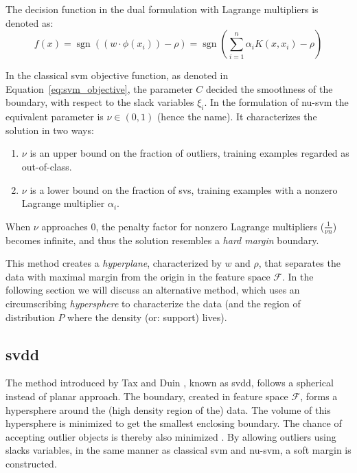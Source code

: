 The decision function in the dual formulation with Lagrange multipliers is denoted as:
\begin{equation}\label{eq:nu-svm_lagrange}
f(x) = \operatorname{sgn}((w \cdot \phi(x_i)) - \rho) = \operatorname{sgn}( \sum_{i=1}^n \alpha_i K(x, x_i) - \rho)
\end{equation}

In the classical \gls{svm} objective function, as denoted in Equation~\ref{eq:svm_objective}, the parameter $C$ decided the smoothness of the boundary, with respect to the slack variables $\xi_i$.
In the formulation of \gls{nu-svm} the equivalent parameter is $\nu \in (0,1)$ (hence the name).
It characterizes the solution in two ways:
\begin{enumerate}
  \item $\nu$ is an upper bound on the fraction of outliers, \ie training examples regarded as out-of-class.
  \item $\nu$ is a lower bound on the fraction of \glspl{sv}, \ie training examples with a nonzero Lagrange multiplier $\alpha_i$.
\end{enumerate}
When $\nu$ approaches $0$, the penalty factor for nonzero Lagrange multipliers ($\frac{1}{\nu n}$) becomes infinite, and thus the solution resembles a \emph{hard margin} boundary.

This method creates a \emph{hyperplane}, characterized by $w$ and $\rho$, that separates the data with maximal margin from the origin in the feature space $\mathcal{F}$.
In the following section we will discuss an alternative method, which uses an circumscribing \emph{hypersphere} to characterize the data (and the region of distribution $P$ where the density (or: support) lives).



\subsection{\acrlong{svdd}}\label{subsec:oc-svm-svdd}
The method introduced by Tax and Duin \cite{tax1999support}, known as \acrlong{svdd}, follows a spherical instead of planar approach.
The boundary, created in feature space $\mathcal{F}$, forms a hypersphere around the (high density region of the) data.
The volume of this hypersphere is minimized to get the smallest enclosing boundary.
The chance of accepting outlier objects is thereby also minimized \cite{tax2003online}.
By allowing outliers using slacks variables, in the same manner as classical \gls{svm} and \gls{nu-svm}, a soft margin is constructed.

